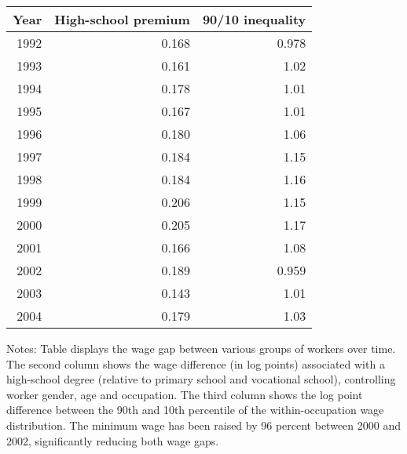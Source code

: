\begin{tabular}{rrr}
\hline \hline
 Year &  High-school premium &  90/10 inequality \\
\hline

1992 & 0.168 & 0.978\\
1993 & 0.161 & 1.02\\
1994 & 0.178 & 1.01\\
1995 & 0.167 & 1.01\\
1996 & 0.180 & 1.06\\
1997 & 0.184 & 1.15\\
1998 & 0.184 & 1.16\\
1999 & 0.206 & 1.15\\
2000 & 0.205 & 1.17\\
2001 & 0.166 & 1.08\\
2002 & 0.189 & 0.959\\
2003 & 0.143 & 1.01\\
2004 & 0.179 & 1.03\\
\hline \hline
\end{tabular}
\begin{tablenotes}
\item \footnotesize Notes: Table displays the wage gap between various groups of workers over time. The second column shows the wage difference (in log points) associated with a high-school degree (relative to primary school and vocational school), controlling worker gender, age and occupation. The third column shows the log point difference between the 90th and 10th percentile of the within-occupation wage distribution. The minimum wage has been raised by 96 percent between 2000 and 2002, significantly reducing both wage gaps.
\end{tablenotes} 